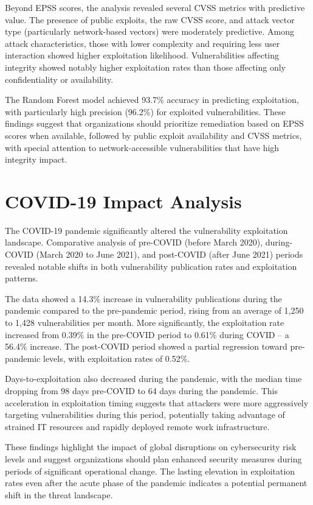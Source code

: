 \documentclass[runningheads]{llncs}
\begin{document}
Beyond EPSS scores, the analysis revealed several CVSS metrics with predictive value. The presence of public exploits, the raw CVSS score, and attack vector type (particularly network-based vectors) were moderately predictive. Among attack characteristics, those with lower complexity and requiring less user interaction showed higher exploitation likelihood. Vulnerabilities affecting integrity showed notably higher exploitation rates than those affecting only confidentiality or availability.

The Random Forest model achieved 93.7\% accuracy in predicting exploitation, with particularly high precision (96.2\%) for exploited vulnerabilities. These findings suggest that organizations should prioritize remediation based on EPSS scores when available, followed by public exploit availability and CVSS metrics, with special attention to network-accessible vulnerabilities that have high integrity impact.

\section{COVID-19 Impact Analysis}
The COVID-19 pandemic significantly altered the vulnerability exploitation landscape. Comparative analysis of pre-COVID (before March 2020), during-COVID (March 2020 to June 2021), and post-COVID (after June 2021) periods revealed notable shifts in both vulnerability publication rates and exploitation patterns.

The data showed a 14.3\% increase in vulnerability publications during the pandemic compared to the pre-pandemic period, rising from an average of 1,250 to 1,428 vulnerabilities per month. More significantly, the exploitation rate increased from 0.39\% in the pre-COVID period to 0.61\% during COVID – a 56.4\% increase. The post-COVID period showed a partial regression toward pre-pandemic levels, with exploitation rates of 0.52\%.

Days-to-exploitation also decreased during the pandemic, with the median time dropping from 98 days pre-COVID to 64 days during the pandemic. This acceleration in exploitation timing suggests that attackers were more aggressively targeting vulnerabilities during this period, potentially taking advantage of strained IT resources and rapidly deployed remote work infrastructure.

These findings highlight the impact of global disruptions on cybersecurity risk levels and suggest organizations should plan enhanced security measures during periods of significant operational change. The lasting elevation in exploitation rates even after the acute phase of the pandemic indicates a potential permanent shift in the threat landscape.
\end{document}
